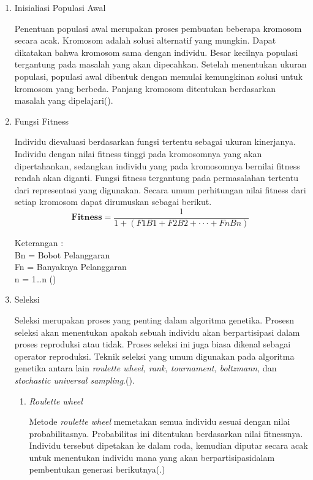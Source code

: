 \begin{enumerate}
  \item Inisialiasi Populasi Awal
  
  Penentuan populasi awal merupakan proses pembuatan beberapa kromosom secara acak. Kromosom adalah solusi alternatif yang mungkin. Dapat dikatakan bahwa kromosom sama dengan individu. Besar kecilnya populasi tergantung pada masalah yang akan dipecahkan. Setelah menentukan ukuran populasi, populasi awal dibentuk dengan memulai kemungkinan solusi untuk kromosom yang berbeda. Panjang kromosom ditentukan berdasarkan masalah yang dipelajari(\cite{Ardiansyah2022}).
  \item Fungsi Fitness
  
  Individu dievaluasi berdasarkan fungsi tertentu sebagai ukuran kinerjanya. 
  Individu dengan nilai fitness tinggi pada kromosomnya yang akan dipertahankan, 
  sedangkan individu yang pada kromosomnya bernilai fitness rendah akan diganti. 
  Fungsi fitness tergantung pada permasalahan tertentu dari representasi yang digunakan. 
  Secara umum perhitungan nilai fitness dari setiap kromosom dapat dirumuskan sebagai berikut.
  \begin{equation}
    \label{eq:fitness}
    \mathbf{Fitness} = \frac{1}{1 + (F1B1 + F2B2 + \cdot \cdot \cdot +  FnBn)}\; 
  \end{equation}

  Keterangan :\\
  Bn = Bobot Pelanggaran\\
  Fn = Banyaknya Pelanggaran\\
  n  = 1…n (\cite{muhammad2020penjadwalan})
  \item Seleksi
  
  Seleksi merupakan proses yang penting dalam algoritma genetika. 
  Prosesn seleksi akan menentukan apakah sebuah individu akan berpartisipasi dalam proses reproduksi atau tidak.
  Proses seleksi ini juga biasa dikenal sebagai operator reproduksi. 
  Teknik seleksi yang umum digunakan pada algoritma genetika antara lain \emph{roulette wheel, rank, tournament, boltzmann,} dan \emph{stochastic universal sampling}.(\cite{Katoch2020}).
  
  \begin{enumerate}
    \item \emph{Roulette wheel}
    

    Metode \emph{roulette wheel} memetakan semua individu sesuai dengan nilai probabilitasnya. Probabilitas ini ditentukan berdasarkan nilai fitnessnya. Individu tersebut dipetakan ke dalam roda, kemudian diputar secara acak untuk menentukan individu mana yang akan berpartisipasidalam pembentukan generasi berikutnya(\cite{Katoch2020}.)
    

\end{enumerate}
\end{enumerate}
